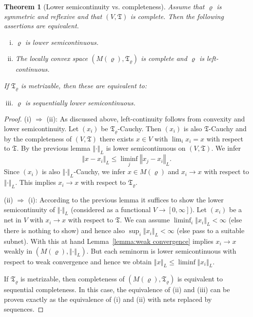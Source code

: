 \documentclass[a4paper,11pt,reqno]{amsart}
\newtheorem{theorem}[lemma]{Theorem}
\theoremstyle{definition}
\numberwithin{equation}{section}
\newcommand{\vr}{{\varrho}}
\newcommand{\av}[1]{\left\Vert #1\right\Vert}
\newcommand{\1}{\mathds{1}}
\begin{document}
 






\begin{theorem}[Lower semicontinuity vs. completeness]\label{theorem:lower semicontinuity versus completeness}
 Assume that $\vr$ is symmetric and reflexive and that $(V,\mathfrak{T})$ is complete. Then the following assertions are equivalent. 
 \begin{enumerate}[(i)]
  \item $\vr$ is lower semicontinuous. 
  \item The locally convex space $(M(\vr),\mathfrak{T}_\vr)$ is complete and $\vr$ is left-continuous. 
 \end{enumerate}
 If $\mathfrak{T}_\vr$ is metrizable, then these are equivalent to:
 \begin{enumerate}[(i)]\setcounter{enumi}{2}
  \item $\vr$ is sequentially lower semicontinuous. 
 \end{enumerate}

\end{theorem}
\begin{proof}
 (i) $\Rightarrow$ (ii): As discussed above, left-continuity follows from convexity and lower semicontinuity.  Let $(x_i)$ be $\mathfrak{T}_\vr$-Cauchy. Then $(x_i)$ is also $\mathfrak{T}$-Cauchy and by the completeness of $(V,\mathfrak{T})$ there exists $x \in V$ with $\lim_i x_i = x$ with respect to $\mathfrak{T}$.  By the previous lemma $\av{\cdot}_L$ is lower semicontinuous on $(V,\mathfrak{T})$. We infer 
 $$\av{x - x_i}_L \leq \liminf_{j} \av{x_j - x_i}_L.$$
 Since $(x_i)$ is also $\av{\cdot}_L$-Cauchy, we infer $x \in M(\vr)$ and $x_i \to x$ with respect to $\av{\cdot}_L$. This implies $x_i \to  x$ with respect to $\mathfrak{T}_\vr$. 
 
 (ii) $\Rightarrow$ (i): According to the previous lemma it suffices to show the lower semicontinuity of $\av{\cdot}_L$ (considered as a functional $V \to [0,\infty]$).  Let $(x_i)$ be a net in $V$ with $x_i \to x$ with respect to $\mathfrak{T}$. We can assume $\liminf_i \av{x_i}_L < \infty $ (else there is nothing to show) and hence also $\sup_i \av{x_i}_L < \infty$ (else pass to a suitable subnet). With this at hand Lemma~\ref{lemma:weak convergence} implies $x_i \to x$ weakly in $(M(\vr),\av{\cdot}_L)$. But each seminorm is lower semicontinuous with respect to weak convergence and hence we obtain $\av{x}_L \leq \liminf \av{x_i}_L$. 

 
 If $\mathfrak{T}_\vr$ is metrizable, then completeness of $(M(\vr),\mathfrak{T}_\vr)$ is equivalent to sequential completeness. In this case, the equivalence of (ii) and (iii) can be proven exactly as the equivalence of (i) and (ii) with nets replaced by sequences.  
 \end{proof}
\end{document}
